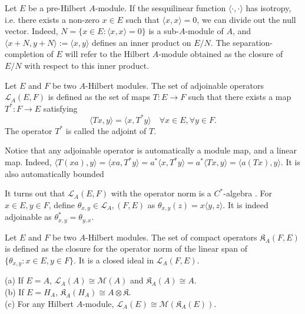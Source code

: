 Let $E$ be a pre-Hilbert $A$-module. If the sesquilinear function $\langle \cdot ,\cdot \rangle$ has isotropy, i.e. there exists a non-zero $x\in E$ such that $\langle x,x\rangle =0$, we can divide out the null vector. Indeed, $N= \{x\in E : \langle x,x\rangle = 0\}$ is a sub-$A$-module of $A$, and $\langle x+ N,y+N\rangle := \langle x,y\rangle $ defines an inner product on $E/N$. The separation-completion of $E$ will refer to the Hilbert $A$-module obtained as the closure of $E/N$ with respect to this inner product. 

\begin{definition}
Let $E$ and $F$ be two $A$-Hilbert modules. The set of adjoinable operators $\mathcal L_A(E,F)$ is defined as the set of maps $T : E\rightarrow F $ such that there exists a map $T^* : F\rightarrow E$ satisfying 
\[\langle Tx, y \rangle = \langle x ,T^* y\rangle\quad \forall x\in E,\forall y\in F.\]
The operator $T^*$ is called the adjoint of $T$.
\end{definition}

\begin{rk}
Notice that any adjoinable operator is automatically a module map, and a linear map. Indeed, $\langle T(xa),y\rangle = \langle xa,T^* y \rangle = a^* \langle x, T^* y\rangle =a^*\langle Tx,  y\rangle =  \langle a(Tx),y \rangle$. It is also automatically bounded
\end{rk}

It turns out that $\mathcal L_A(E,F)$ with the operator norm is a $C^*$-algebra \cite{Lance}. For $x\in E,y\in F$, define $\theta_{x,y}\in\mathcal L_A,(F,E)$ as $\theta_{x,y}(z) = x\langle y,z\rangle$. It is indeed adjoinable as $\theta_{x,y}^*=\theta_{y,x}$.

\begin{definition}
Let $E$ and $F$ be two $A$-Hilbert modules. The set of compact operators $\mathfrak K_A(F,E)$ is defined as the closure for the operator norm of the linear span of $\{\theta_{x,y} : x\in E,y\in F\}$. It is a closed ideal in $\mathcal L_A(F,E)$.\cite{Lance}
\end{definition}

\begin{Expl}
(a) If $E=A$, $\mathcal L_A(A) \cong \mathcal M (A)$ and $\mathfrak K_A(A) \cong A$.\\
(b) If $E=H_A$, $\mathfrak K_A(H_A) \cong A\otimes \mathfrak K$.\\
(c) For any Hilbert $A$-module, $\mathcal L_A(E) \cong \mathcal M(\mathfrak K_A(E))$.
\end{Expl}

